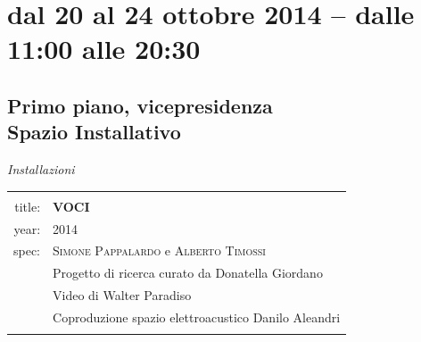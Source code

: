 \documentclass[9pt, twoside, a5paper]{extreport}
\begin{document}
\clearpage






%	
%	
%	
%
%	
%	
%
	\clearpage





\section*{dal 20 al 24 ottobre 2014 -- dalle 11:00 alle 20:30}
\subsection*{\textsf{Primo piano, vicepresidenza\\
	{\small Spazio Installativo\\}}}

{\fontsize{30}{30}\selectfont \textit{Installazioni}}
\bigskip

\noindent
\begin{tabular}{r|p{10cm}}
								&			\\
\textsf{title:}					&			\textbf{VOCI}						\\
\textsf{year:}					&			2014								\\
\textsf{spec:}					&			\textsc{Simone Pappalardo} e \textsc{Alberto Timossi} 				\\
								&			Progetto di ricerca curato da Donatella Giordano \\
								&			Video di Walter Paradiso\\
								&			Coproduzione spazio elettroacustico Danilo Aleandri\\
								&			\\ %
\hline
\hline


\end{tabular}
\end{document}
